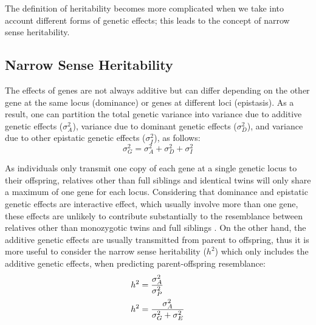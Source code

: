 	The definition of heritability becomes more complicated when we take into account different forms of genetic effects; this leads to the concept of narrow sense heritability.
	
	\subsection{Narrow Sense Heritability}
	The effects of genes are not always additive but can differ depending on the other gene at the same locus (dominance) or genes at different loci (epistasis).
	As a result, one can partition the total genetic variance into variance due to additive genetic effects ($\sigma_A^2$), variance due to dominant genetic effects ($\sigma_D^2$), and variance due to other epistatic genetic effects ($\sigma_I^2$), as follows:
	$$
	\sigma_G^2=\sigma_A^2+\sigma_D^2+\sigma_I^2
	$$
	
	As individuals only transmit one copy of each gene at a single genetic locus to their offspring, relatives other than full siblings and identical twins will only share a maximum of one gene for each locus.
	Considering that dominance and epistatic genetic effects are interactive effect, which usually involve more than one gene, these effects are unlikely to contribute substantially to the resemblance between relatives other than monozygotic twins and full siblings \citep{Visscher2008}.
	On the other hand, the additive genetic effects are usually transmitted from parent to offspring, thus it is more useful to consider the narrow sense heritability ($h^2$) which only includes the additive genetic effects, when predicting parent-offspring resemblance:
	\begin{align}
	h^2&=\frac{\sigma_A^2}{\sigma_P^2} \notag\\
	h^2&=\frac{\sigma_A^2}{\sigma_G^2+\sigma_E^2}
	\label{eq:narrowHeritability}
	\end{align}
	
